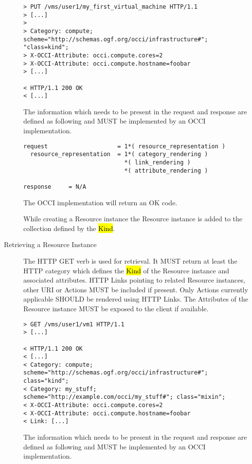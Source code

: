 \documentclass[10pt,a4paper]{article}
\begin{document}
\begin{description}
\begin{verbatim}
> PUT /vms/user1/my_first_virtual_machine HTTP/1.1
> [...]
> 
> Category: compute; scheme="http://schemas.ogf.org/occi/infrastructure#"; "class=kind"; 
> X-OCCI-Attribute: occi.compute.cores=2
> X-OCCI-Attribute: occi.compute.hostname=foobar
> [...]
 
< HTTP/1.1 200 OK
< [...]
\end{verbatim}

    The information which needs to be present in the request and
    response are defined as following and MUST be implemented by an
    OCCI implementation.

\begin{verbatim}
request                    = 1*( resource_representation )
  resource_representation  = 1*( category_rendering )
                             *( link_rendering )
                             *( attribute_rendering )

response     = N/A
\end{verbatim}

    The OCCI implementation will return an OK code.
  
    While creating a Resource instance the Resource instance is added
    to the collection defined by the \hl{Kind}.

  \item[Retrieving a Resource Instance] The HTTP GET
    verb is used for retrieval. It MUST return at least the HTTP category which
    defines the \hl{Kind} of the Resource instance and associated attributes. HTTP Links
    pointing to related Resource instances, other URI or Actions MUST
    be included if present. Only Actions currently applicable SHOULD
    be rendered using HTTP Links. The Attributes of the Resource
    instance MUST be exposed to the client if available.

\begin{verbatim}
> GET /vms/user1/vm1 HTTP/1.1
> [...]
 
< HTTP/1.1 200 OK
< [...]
< Category: compute; scheme="http://schemas.ogf.org/occi/infrastructure#"; class="kind";
< Category: my_stuff; scheme="http://example.com/occi/my_stuff#"; class="mixin";
< X-OCCI-Attribute: occi.compute.cores=2
< X-OCCI-Attribute: occi.compute.hostname=foobar
< Link: [...]
\end{verbatim}

    The information which needs to be present in the request and
    response are defined as following and MUST be implemented by an
    OCCI implementation.


\end{description}
\end{document}
